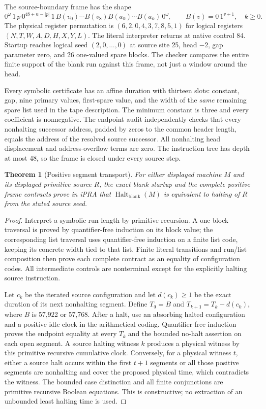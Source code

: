 \documentclass[10pt,letterpaper]{article}
\newtheorem{theorem}{Theorem}[section]
\newcommand{\Halt}{\operatorname{Halt}_{\mathrm{blank}}}
\begin{document}
The source-boundary frame has the shape
\[
  0^\omega\,1\,p\,0^{48+n-|p|}\,1\,B(v_0)\cdots B(v_8)
       B(a_0)\cdots B(a_k)\,0^\omega,
  \qquad B(v)=0\,1^{v+1},\quad k\ge0.
\]
The physical register permutation is
$(6,2,0,4,3,7,8,5,1)$ for logical registers
$(N,T,W,A,D,H,X,Y,L)$. The literal interpreter returns at native control
84. Startup reaches logical seed $(2,0,\ldots,0)$ at source site 25, head
$-2$, gap parameter zero, and 26 one-valued spare blocks. The checker
compares the entire finite support of the blank run against this frame,
not just a window around the head.

Every symbolic certificate has an affine duration with thirteen slots:
constant, gap, nine primary values, first-spare value, and the width of
the \emph{same} remaining spare list used in the tape description.
The minimum constant is three and every coefficient is nonnegative.
The endpoint audit independently checks that every nonhalting successor
address, padded by zeros to the common header length, equals the address
of the resolved source successor. All nonhalting head displacement and
address-overflow terms are zero. The instruction tree has depth at most
48, so the frame is closed under every source step.

\begin{theorem}[Positive segment transport]
For either displayed machine $M$ and its displayed primitive source $R$,
the exact blank startup and the complete positive frame contracts prove
in iPRA that $\Halt(M)$ is equivalent to halting of $R$ from the stated
source seed.
\end{theorem}
\begin{proof}
Interpret a symbolic run length by primitive recursion. A one-block
traversal is proved by quantifier-free induction on its block value;
the corresponding list traversal uses quantifier-free induction on a
finite list code, keeping its concrete width tied to that list. Finite
literal transitions and run/list composition then prove each complete
contract as an equality of configuration codes. All intermediate controls
are nonterminal except for the explicitly halting source instruction.

Let $c_k$ be the iterated source configuration and let $d(c_k)\ge1$ be
the exact duration of its next nonhalting segment. Define
$T_0=B$ and $T_{k+1}=T_k+d(c_k)$, where $B$ is 57,922 or 57,768.
After a halt, use an absorbing halted configuration and a positive idle
clock in the arithmetical coding. Quantifier-free induction proves the
endpoint equality at every $T_k$ and the bounded no-halt assertion on
each open segment. A source halting witness $k$ produces a physical
witness by this primitive recursive cumulative clock. Conversely, for
a physical witness $t$, either a source halt occurs within the first
$t+1$ segments or all those positive segments are nonhalting and cover
the proposed physical time, which contradicts the witness. The bounded
case distinction and all finite conjunctions are primitive recursive
Boolean equations. This is constructive; no extraction of an unbounded
least halting time is used.
\end{proof}
\end{document}
